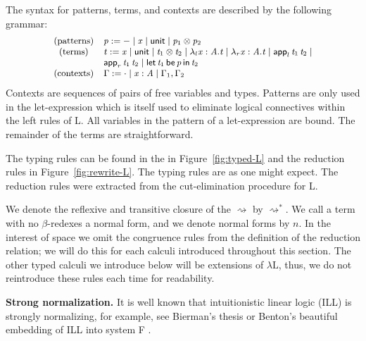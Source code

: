\documentclass{llncs}
\newcommand{\redto}{\rightsquigarrow}
\newcommand{\Lnt}[1]{\mathit{#1}}
\newcommand{\Lmv}[1]{\mathit{#1}}
\newcommand{\Lsym}[1]{#1}
\begin{document}
The syntax for patterns, terms, and contexts are described by the
following grammar:
\vspace{-10px}
\[ \small
\begin{array}{cll}
  \text{(patterns)} & \Lnt{p} :=  -  \mid \Lmv{x} \mid  \mathsf{unit}  \mid  \Lnt{p_{{\mathrm{1}}}}  \otimes  \Lnt{p_{{\mathrm{2}}}} \\
  \text{(terms)}    & \Lnt{t} := \Lmv{x} \mid  \mathsf{unit}  \mid  \Lnt{t_{{\mathrm{1}}}}  \otimes  \Lnt{t_{{\mathrm{2}}}}  \mid  \lambda_l  \Lmv{x} : \Lnt{A} . \Lnt{t}  \mid  \lambda_r  \Lmv{x} : \Lnt{A} . \Lnt{t}  \mid
   \mathsf{app}_l\, \Lnt{t_{{\mathrm{1}}}} \, \Lnt{t_{{\mathrm{2}}}}  \mid \\ &  \mathsf{app}_r\, \Lnt{t_{{\mathrm{1}}}} \, \Lnt{t_{{\mathrm{2}}}}  \mid  \mathsf{let}\, \Lnt{t_{{\mathrm{1}}}} \,\mathsf{be}\, \Lnt{p} \,\mathsf{in}\, \Lnt{t_{{\mathrm{2}}}} \\
  \text{(contexts)} & \Gamma :=  \cdot  \mid \Lmv{x}  \Lsym{:}  \Lnt{A} \mid \Gamma_{{\mathrm{1}}}  \Lsym{,}  \Gamma_{{\mathrm{2}}}\\
\end{array}
\vspace{-10px}
\]
Contexts are sequences of pairs of free variables and types.  Patterns
are only used in the let-expression which is itself used to eliminate
logical connectives within the left rules of L.  All variables in the
pattern of a let-expression are bound.  The remainder of the terms are
straightforward.

The typing rules can be found in the in Figure~\ref{fig:typed-L} and
the reduction rules in Figure~\ref{fig:rewrite-L}. The typing rules
are as one might expect.  The reduction rules were extracted from the
cut-elimination procedure for L.

We denote the reflexive and transitive closure of the $ \redto $ by
$ \redto^* $.  We call a term with no $\beta$-redexes a normal form,
and we denote normal forms by $\Lnt{n}$.  In the interest of space we
omit the congruence rules from the definition of the reduction
relation; we will do this for each calculi introduced throughout this
section.  The other typed calculi we introduce below will be
extensions of $\lambda\text{L}$, thus, we do not reintroduce these
rules each time for readability.

\textbf{Strong normalization.}  It is well known that intuitionistic
linear logic (ILL) is strongly normalizing, for example, see Bierman's
thesis \cite{Bierman:1994} or Benton's beautiful embedding of ILL into
system F \cite{Benton:1995c}.  
\end{document}
